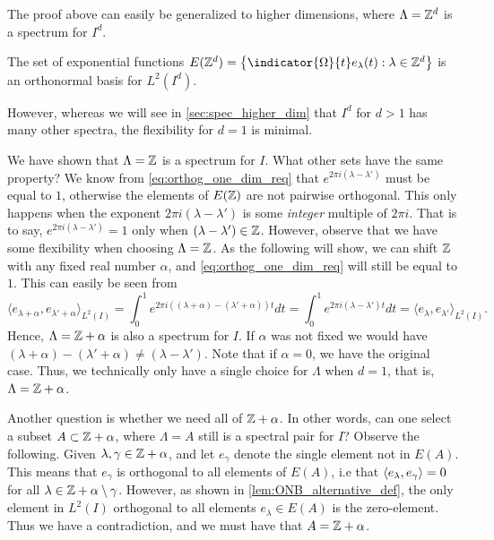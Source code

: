\documentclass[../thesis.tex]{subfiles}
\begin{document}
The proof above can easily be generalized to higher dimensions, where $\Lambda = \mathbb{Z}^d$ is a spectrum for $I^d$.
\begin{lemma}
    The set of exponential functions $E(\Z^d) = \braqMed{\indicator{\Omega}{t} e_\lambda(t) : \lambda \in \Z^d}$ is an orthonormal basis for $L^2(I^d)$.
\end{lemma}

However, whereas we will see in \cref{sec:spec_higher_dim} that $I^d$ for $d>1$ has many other spectra, the flexibility for $d=1$ is minimal. 

We have shown that $\Lambda = \mathbb{Z}$ is a spectrum for $I$. What other sets have the same property? We know from \cref{eq:orthog_one_dim_req} that $e^{2\pi i(\lambda-\lambda')}$ must be equal to $1$, otherwise the elements of $E(\mathbb{Z})$ are not pairwise orthogonal. This only happens when the exponent  $2\pi i (\lambda - \lambda')$ is some \emph{integer} multiple of $2 \pi i$. That is to say, $e^{2\pi i(\lambda-\lambda')} = 1$ only when $(\lambda-\lambda') \in \mathbb{Z}$. However, observe that we have some flexibility when choosing $\Lambda = \mathbb{Z}$. As the following will show, we can shift $\mathbb{Z}$ with any fixed real number $\alpha$, and \cref{eq:orthog_one_dim_req} will still be equal to $1$. This can easily be seen from 
\begin{equation}
    \langle e_{\lambda+\alpha},e_{\lambda'+\alpha} \rangle_{L^2(I)} = \int_0^1 e^{2 \pi i ((\lambda+\alpha) - (\lambda'+\alpha))t} dt = \int_0^1 e^{2 \pi i (\lambda-\lambda')t} dt = \langle e_{\lambda},e_{\lambda'} \rangle_{L^2(I)}.
\end{equation}
Hence, $\Lambda = \mathbb{Z} + \alpha$ is also a spectrum for $I$. If $\alpha$ was not fixed we would have $(\lambda+\alpha) - (\lambda'+\alpha) \neq (\lambda - \lambda')$. Note that if $\alpha=0$, we have the original case. Thus, we technically only have a single choice for $\Lambda$ when $d=1$, that is, $\Lambda = \mathbb{Z}+ \alpha$. 

Another question is whether we need all of $\mathbb{Z} +\alpha$. In other words, can one select a subset $A\subset \mathbb{Z} + \alpha$, where $\Lambda = A$ still is a spectral pair for $I$? Observe the following. Given $\lambda, \gamma \in \mathbb{Z}+\alpha$, and let $e_{\gamma}$ denote the single element not in $E(A)$. This means that $e_\gamma$ is orthogonal to all elements of $E(A)$, i.e that $\langle e_{\lambda}, e_{\gamma}\rangle = 0$ for all $\lambda \in \mathbb{Z} +\alpha\setminus \gamma$. However, as shown in \cref{lem:ONB_alternative_def}, the only element in $L^2(I)$ orthogonal to all elements $e_{\lambda} \in E(A)$ is the zero-element. Thus we have a contradiction, and we must have that $A = \mathbb{Z}+\alpha$.
\end{document}
